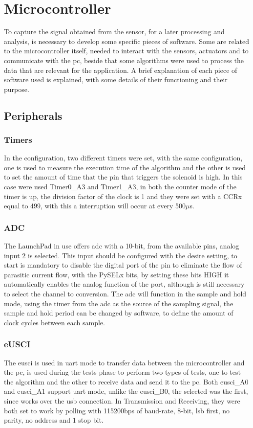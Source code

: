 \section{Microcontroller}

To capture the signal obtained from the sensor, for a later processing and analysis, is necessary to develop some specific pieces of software. Some are related to the microcontroller itself, needed to interact with the sensors, actuators and to communicate with the \acrshort{pc}, beside that some algorithms were used to process the data that are relevant for the application. A brief explanation of each piece of software used is explained, with some details of their functioning and their purpose.
\subsection{Peripherals}
\subsubsection*{Timers}
In the configuration, two different timers were set, with the same configuration, one is used to measure the execution time of the algorithm and the other is used to set the amount of time that the pin that triggers the solenoid is high. In this case were used Timer0\_A3 and Timer1\_A3, in both the counter mode of the timer is up, the division factor of the clock is 1 and they were set with a CCRx equal to 499, with this a interruption will occur at every 500$\mu$s.
\subsubsection*{ADC}
The LaunchPad in use offers \acrshort{adc} with a 10-bit, from the available pins, analog input 2 is selected. This input should be configured with the desire setting, to start is mandatory to disable the digital port of the pin to eliminate the flow of parasitic current flow, with the PySELx bits, by setting these bits HIGH it automatically enables the analog function of the port, although is still necessary to select the channel to conversion. The \acrshort{adc} will function in the sample and hold mode, using the timer from the \acrshort{adc} as the source of the sampling signal, the sample and hold period can be changed by software, to define the amount of clock cycles between each sample. 
\subsubsection*{eUSCI}
The \acrshort{eusci} is used in \acrshort{uart} mode to transfer data between the microcontroller and the \acrshort{pc}, is used during the tests phase to perform two types of tests, one to test the algorithm and the other to receive data and send it to the \acrshort{pc}. Both \acrshort{eusci}\_A0 and \acrshort{eusci}\_A1 support \acrshort{uart} mode, unlike the \acrshort{eusci}\_B0, the selected was the first, since works over the \acrshort{usb} connection. In Transmission and Receiving, they were both set to work by polling with 115200bps of baud-rate, 8-bit, \acrshort{lsb} first, no parity, no address and 1 stop bit.
